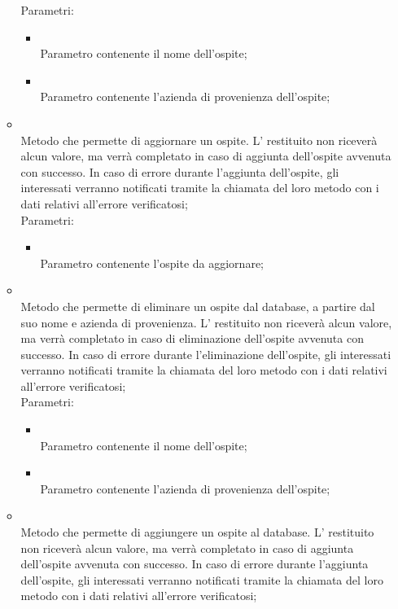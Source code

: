 \begin{itemize}
\begin{itemize}
		Parametri:
		\begin{itemize}
			\item {} \\
			Parametro contenente il nome dell'ospite;
			\item {} \\
			Parametro contenente l'azienda di provenienza dell'ospite;
		\end{itemize}
		\item[]  \\
		Metodo che permette di aggiornare un ospite.  L' restituito non riceverà alcun valore, ma verrà completato in caso di aggiunta dell'ospite avvenuta con successo. In caso di errore durante l'aggiunta dell'ospite, gli  interessati verranno notificati tramite la chiamata del loro metodo  con i dati relativi all'errore verificatosi;\\
		Parametri:
		\begin{itemize}
			\item {} \\
			Parametro contenente l'ospite da aggiornare;
		\end{itemize}
		\item[]  \\
		Metodo che permette di eliminare un ospite dal database, a partire dal suo nome e azienda di provenienza.  L' restituito non riceverà alcun valore, ma verrà completato in caso di eliminazione  dell'ospite avvenuta con successo. In caso di errore durante l'eliminazione dell'ospite, gli  interessati verranno notificati tramite la chiamata del loro metodo  con i dati relativi all'errore verificatosi;\\
		Parametri:
		\begin{itemize}
			\item {} \\
			Parametro contenente il nome dell'ospite;
			\item {} \\
			Parametro contenente l'azienda di provenienza dell'ospite;
		\end{itemize}
		\item[]  \\
		Metodo che permette di aggiungere un ospite al database.  L' restituito non riceverà alcun valore, ma verrà completato in caso di aggiunta dell'ospite avvenuta con successo. In caso di errore durante l'aggiunta dell'ospite, gli  interessati verranno notificati tramite la chiamata del loro metodo  con i dati relativi all'errore verificatosi;\\

\end{itemize}
\end{itemize}
